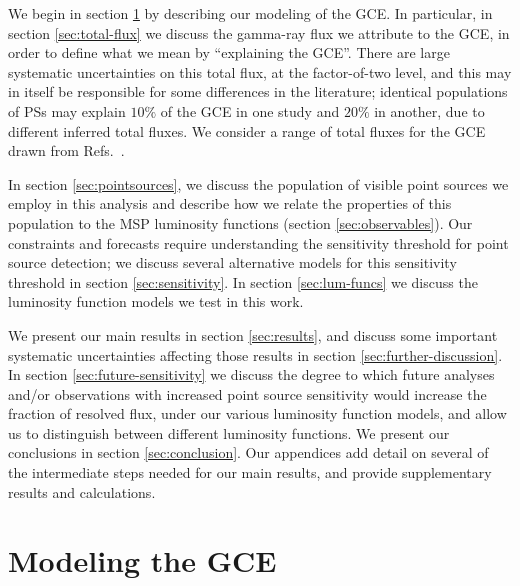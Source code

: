 \documentclass[letter,11pt]{article}
\begin{document}
We begin in section \ref{sec:methods} by describing our modeling of the GCE. In particular, in section \ref{sec:total-flux} we discuss the gamma-ray flux we attribute to the GCE, in order to define what we mean by ``explaining the GCE''. There are large systematic uncertainties on this total flux, at the factor-of-two level, and this may in itself be responsible for some differences in the literature; identical populations of PSs may explain $10\%$ of the GCE in one study and $20\%$ in another, due to different inferred total fluxes. We consider a range of total fluxes for the GCE drawn from Refs.~\cite{DiMauro:2021raz, Calore:2014xka, Zhong:2019ycb, Gordon13, Ajello:2015kwa, Ajello:2017opo}.

In section \ref{sec:pointsources}, we discuss the population of visible point sources we employ in this analysis and describe how we relate the properties of this population to the MSP luminosity functions (section \ref{sec:observables}). Our constraints and forecasts require understanding the sensitivity threshold for point source detection; we discuss several alternative models for this sensitivity threshold in section \ref{sec:sensitivity}. In section \ref{sec:lum-funcs} we discuss the luminosity function models we test in this work.

We present our main results in section \ref{sec:results}, and discuss some important systematic uncertainties affecting those results in section \ref{sec:further-discussion}. In section \ref{sec:future-sensitivity} we discuss the degree to which future analyses and/or observations with increased point source sensitivity would increase the fraction of resolved flux, under our various luminosity function models, and allow us to distinguish between different luminosity functions. We present our conclusions in section \ref{sec:conclusion}. Our appendices add detail on several of the intermediate steps needed for our main results, and provide supplementary results and calculations.

\section{Modeling the GCE}
\label{sec:methods}
\end{document}
